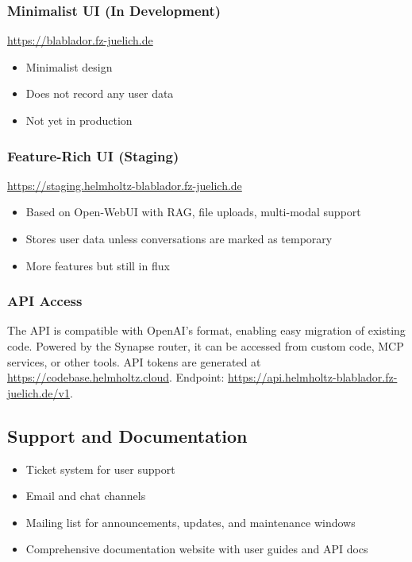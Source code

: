 \documentclass[10pt,conference]{IEEEtran}
\begin{document}
\subsubsection{Minimalist UI (In Development)}
\url{https://blablador.fz-juelich.de}
\begin{itemize}
    \item Minimalist design
    \item Does not record any user data
    \item Not yet in production
\end{itemize}

\subsubsection{Feature-Rich UI (Staging)}
\url{https://staging.helmholtz-blablador.fz-juelich.de}
\begin{itemize}
    \item Based on Open-WebUI with RAG, file uploads, multi-modal support
    \item Stores user data unless conversations are marked as temporary
    \item More features but still in flux
\end{itemize}

\subsubsection{API Access}
The API is compatible with OpenAI's format, enabling easy migration of existing code. Powered by the Synapse router, it can be accessed from custom code, MCP services, or other tools. API tokens are generated at \url{https://codebase.helmholtz.cloud}. Endpoint: \url{https://api.helmholtz-blablador.fz-juelich.de/v1}.

\subsection{Support and Documentation}
\begin{itemize}
    \item Ticket system for user support
    \item Email and chat channels
    \item Mailing list for announcements, updates, and maintenance windows
    \item Comprehensive documentation website with user guides and API docs
\end{itemize}
\end{document}
